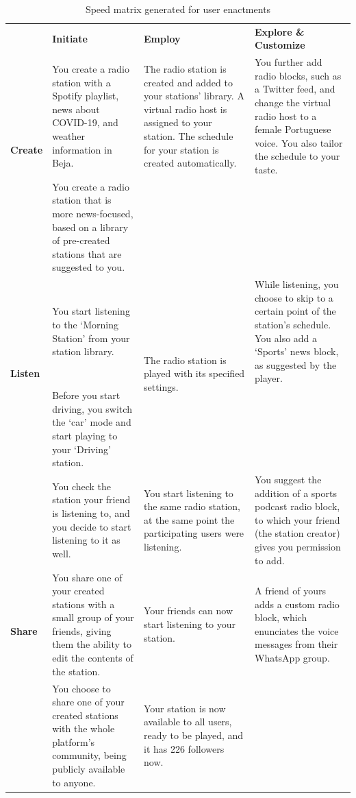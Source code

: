 {{\renewcommand{\arraystretch}{2}%
\begin{table}[]
\setlength\tabcolsep{10pt}
\begin{tabularx}{\textwidth}{|l|X|X|X|}
\hline
\multirow{3}{*}{\textbf{Create}} &
  \textbf{Initiate} &
  \textbf{Employ} &
  \textbf{Explore \& Customize} \\ \cline{2-4} 
 &
  You create a radio station with a Spotify playlist, news about COVID-19, and weather information in Beja. &
  The radio station is created and added to your stations’ library. A virtual radio host is assigned to your station. The schedule for your station is created automatically. &
  You further add radio blocks, such as a Twitter feed, and change the virtual radio host to a female Portuguese voice. You also tailor the schedule to your taste. \\ \cline{2-2}
 &
  You create a radio station that is more news-focused, based on a library of pre-created stations that are suggested to you. &
   &
   \\ \hline
\multirow{2}{*}{\textbf{Listen}} &
  You start listening to the ‘Morning Station’ from your station library. &
  \multirow{2}{4.5cm}{The radio station is played with its specified settings.} &
  While listening, you choose to skip to a certain point of the station’s schedule. You also add a ‘Sports’ news block, as suggested by the player. \\ \cline{2-2} \cline{4-4} 
 &
  Before you start driving, you switch the ‘car’ mode and start playing to your ‘Driving’ station. &
   &
   \\ \hline
\multirow{3}{*}{\textbf{Share}} &
  You check the station your friend is listening to, and you decide to start listening to it as well. &
  You start listening to the same radio station, at the same point the participating users were listening. &
  You suggest the addition of a sports podcast radio block, to which your friend (the station creator) gives you permission to add. \\ \cline{2-4} 
 &
  You share one of your created stations with a small group of your friends, giving them the ability to edit the contents of the station. &
  Your friends can now start listening to your station. &
  A friend of yours adds a custom radio block, which enunciates the voice messages from their WhatsApp group. \\ \cline{2-4} 
 &
  You choose to share one of your created stations with the whole platform’s community, being publicly available to anyone. &
  Your station is now available to all users, ready to be played, and it has 226 followers now. &
   \\ \hline
\end{tabularx}
\caption{Speed matrix generated for user enactments}
\label{tab:sdmatrix}
\vspace{-4mm}
\end{table}


}}
